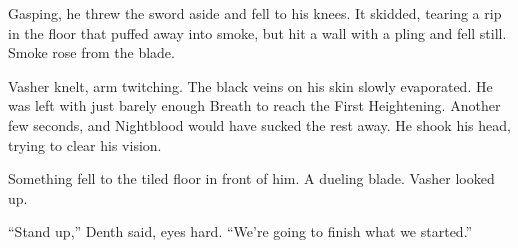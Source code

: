 Gasping, he threw the sword aside and fell to his knees. It skidded, tearing a rip in the floor that puffed away into smoke, but hit a wall with a pling and fell still. Smoke rose from the blade.

Vasher knelt, arm twitching. The black veins on his skin slowly evaporated. He was left with just barely enough Breath to reach the First Heightening. Another few seconds, and Nightblood would have sucked the rest away. He shook his head, trying to clear his vision.

Something fell to the tiled floor in front of him. A dueling blade. Vasher looked up.

“Stand up,” Denth said, eyes hard. “We’re going to finish what we started.”

